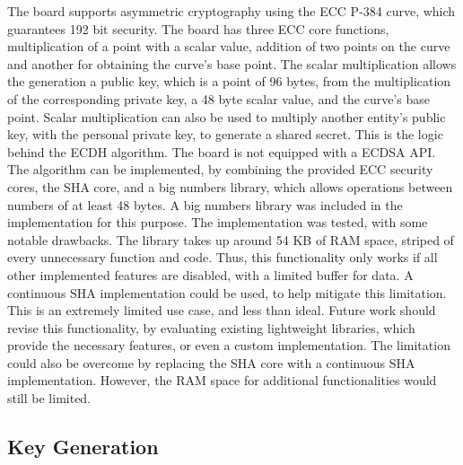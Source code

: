 The board supports asymmetric cryptography using the \ac{ECC} P-384 curve, which guarantees 192 bit security. The board has three \ac{ECC} core functions, multiplication of a point with a scalar value, addition of two points on the curve and another for obtaining the curve's base point. The scalar multiplication allows the generation a public key, which is a point of 96 bytes, from the multiplication of the corresponding private key, a 48 byte scalar value, and the curve's base point. Scalar multiplication can also be used to multiply another entity's public key, with the personal private key, to generate a shared secret. This is the logic behind the \ac{ECDH} algorithm.
The board is not equipped with a \ac{ECDSA} API. The algorithm can be implemented, by combining the provided ECC security cores, the SHA core, and a big numbers library, which allows operations between numbers of at least 48 bytes.
A big numbers library was included in the implementation for this purpose. The implementation was tested, with some notable drawbacks.
The library takes up around 54 KB of RAM space, striped of every unnecessary function and code. Thus, this functionality only works if all other implemented features are disabled, with a limited buffer for data. A continuous SHA implementation could be used, to help mitigate this limitation.
This is an extremely limited use case, and less than ideal. Future work should revise this functionality, by evaluating existing lightweight libraries, which provide the necessary features, or even a custom implementation. The limitation could also be overcome by replacing the SHA core with a continuous SHA implementation. However, the RAM space for additional functionalities would still be limited.

\subsection{Key Generation}\label{chap:implementation:services:key-generation}

